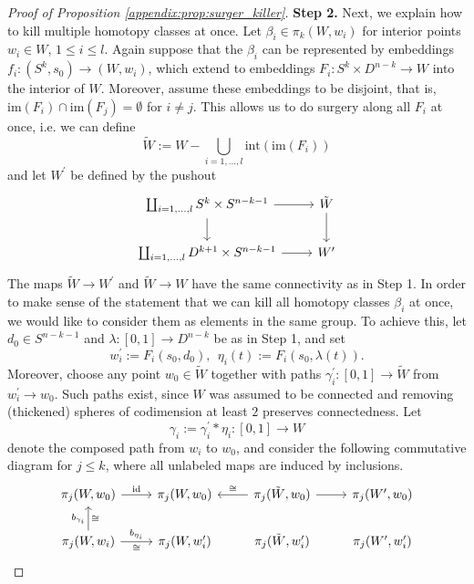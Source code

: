 \begin{proof}[Proof of Proposition \ref{appendix:prop:surger_killer}]
    \noindent \textbf{Step 2.} Next, we explain how to kill multiple homotopy classes at once. Let \linebreak $\beta_i \in \pi_k(W,w_i)$ for interior points $w_i \in W$, $1 \leq i \leq l$. Again suppose that the $\beta_i$ can be represented by embeddings $f_i \colon (S^k,s_0) \to (W,w_i)$, which extend to embeddings $F_i \colon S^k \times D^{n-k} \to W$ into the interior of $W$. Moreover, assume these embeddings to be disjoint, that is, $\mathrm{im}(F_i) \cap \mathrm{im}(F_j) = \emptyset$ for $i \neq j$. This allows us to do surgery along all $F_i$ at once, i.e. we can define 
    \[
    \tilde{W} := W - \bigcup_{i=1,\ldots,l} \mathrm{int}(\mathrm{im}(F_i))
    \]
    and let $W^\prime$ be defined by the pushout 
    \[\begin{tikzcd}
	{\coprod_{i=1,\ldots,l} S^k \times S^{n-k-1}} & {\tilde{W}} \\
	{\coprod_{i=1,\ldots,l}D^{k+1} \times S^{n-k-1}} & {W^\prime}
	\arrow[from=1-1, to=1-2]
	\arrow[from=1-1, to=2-1]
	\arrow[from=1-2, to=2-2]
	\arrow[from=2-1, to=2-2]
    \end{tikzcd}\]
    The maps $\tilde{W} \to W^\prime$ and $\tilde{W} \to W$ have the same connectivity as in Step 1. In order to make sense of the statement that we can kill all homotopy classes $\beta_i$ at once, we would like to consider them as elements in the same group. To achieve this, let $d_0 \in S^{n-k-1}$ and $\lambda \colon [0,1] \to D^{n-k}$ be as in Step 1, and set 
    \[
    w_i^\prime := F_i(s_0,d_0), \; \, \eta_i(t) := F_i(s_0,\lambda(t)).
    \]
    Moreover, choose any point $w_0 \in \tilde{W}$ together with paths $\gamma_i^\prime \colon [0,1] \to \tilde{W}$ from $w_i^\prime \to w_0$. Such paths exist, since $W$ was assumed to be connected and removing (thickened) spheres of codimension at least $2$ preserves connectedness. Let 
    \[
    \gamma_i := \gamma_i^\prime \ast \eta_i \colon [0,1] \to W
    \]
    denote the composed path from $w_i$ to $w_0$, and consider the following commutative diagram for $j \leq k$, where all unlabeled maps are induced by inclusions.
    \[\begin{tikzcd}
	{\pi_j(W,w_0)} & {\pi_j(W,w_0)} & {\pi_j(\tilde{W},w_0)} & {\pi_j(W^\prime,w_0)} \\
	{\pi_j(W,w_i)} & {\pi_j(W,w_i^\prime)} & {\pi_j(\tilde{W},w_i^\prime)} & {\pi_j(W^\prime,w_i^\prime)}
	\arrow["{\mathrm{id}}", from=1-1, to=1-2]
	\arrow["\cong"', from=1-3, to=1-2]
	\arrow[from=1-3, to=1-4]
	\arrow["{b_{\gamma_i}}", "\cong"', from=2-1, to=1-1]
	\arrow["{b_{\eta_i}}", "\cong"', from=2-1, to=2-2]

\end{tikzcd}\]
\end{proof}
